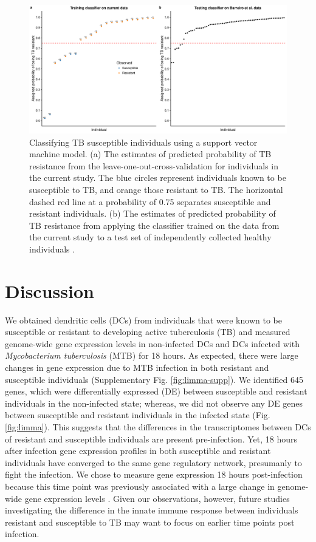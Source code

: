 \documentclass[fleqn,10pt]{wlscirep}
\begin{document}
\begin{figure}[ht]
\centering
\includegraphics[width=\linewidth]{../figure/classifier-svm.pdf}
\caption{
Classifying TB susceptible individuals using a support vector machine
model. (a) The estimates of predicted probability of TB resistance
from the leave-one-out-cross-validation for individuals in the current
study. The blue circles represent individuals known to be susceptible
to TB, and orange those resistant to TB. The horizontal dashed red
line at a probability of 0.75 separates susceptible and resistant
individuals. (b) The estimates of predicted probability of TB
resistance from applying the classifier trained on the data from the
current study to a test set of independently collected healthy
individuals \cite{Barreiro2012}.
}
\label{fig:classifier}
\end{figure}

\section*{Discussion}

We obtained dendritic cells (DCs) from individuals that were known to
be susceptible or resistant to developing active tuberculosis (TB) and
measured genome-wide gene expression levels in non-infected DCs and
DCs infected with \emph{Mycobacterium tuberculosis} (MTB) for 18
hours. As expected, there were large changes in gene expression due to
MTB infection in both resistant and susceptible individuals
(Supplementary Fig. \ref{fig:limma-supp}). We identified 645 genes,
which were differentially expressed (DE) between susceptible and
resistant individuals in the non-infected state; whereas, we did not
observe any DE genes between susceptible and resistant individuals in
the infected state (Fig. \ref{fig:limma}). This suggests that the
differences in the transcriptomes between DCs of resistant and
susceptible individuals are present pre-infection. Yet, 18 hours after
infection gene expression profiles in both susceptible and resistant
individuals have converged to the same gene regulatory network,
presumanly to fight the infection. We chose to measure gene expression
18 hours post-infection because this time point was previously
associated with a large change in genome-wide gene expression levels
\cite{Tailleux2008}. Given our observations, however, future studies
investigating the difference in the innate immune response between
individuals resistant and susceptible to TB may want to focus on
earlier time points post infection.
\end{document}
